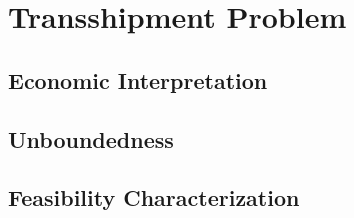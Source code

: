 \documentclass[../../main.tex]{subfiles}
\begin{document}
\section{Transshipment Problem}




\subsection{Economic Interpretation}
\subsection{Unboundedness}
\subsection{Feasibility Characterization}\label{sec:tp_feasiblity-characterization}
\end{document}
